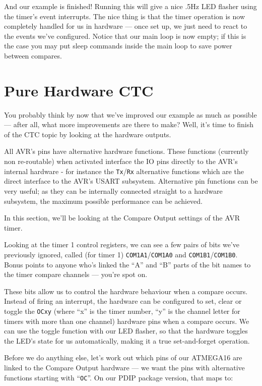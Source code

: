 \documentclass[a4paper,oneside,notitlepage]{book}
\begin{document}
And our example is finished! Running this will give a nice .5Hz LED flasher using the timer's event interrupts. The nice thing is that the timer operation is now completely handled for us in hardware --- once set up, we just need to react to the events we've configured. Notice that our main loop is now empty; if this is the case you may put sleep commands inside the main loop to save power between compares.


\label{chp:HWCTC}
\chapter{Pure Hardware CTC}

You probably think by now that we've improved our example as much as possible --- after all, what more improvements are there to make? Well, it's time to finish of the CTC topic by looking at the hardware outputs.

All AVR's pins have alternative hardware functions. These functions (currently non re-routable) when activated interface the IO pins directly to the AVR's internal hardware - for instance the \texttt{Tx}/\texttt{Rx} alternative functions which are the direct interface to the AVR's USART subsystem. Alternative pin functions can be very useful; as they can be internally connected straight to a hardware subsystem, the maximum possible performance can be achieved.

In this section, we'll be looking at the Compare Output settings of the AVR timer.

Looking at the timer 1 control registers, we can see a few pairs of bits we've previously ignored, called (for timer 1) \texttt{COM1A1}/\texttt{COM1A0} and \texttt{COM1B1}/\texttt{COM1B0}. Bonus points to anyone who's linked the ``A'' and ``B'' parts of the bit names to the timer compare channels --- you're spot on.

These bits allow us to control the hardware behaviour when a compare occurs. Instead of firing an interrupt, the hardware can be configured to set, clear or toggle the \texttt{OCxy} (where ``x'' is the timer number, ``y'' is the channel letter for timers with more than one channel) hardware pins when a compare occurs. We can use the toggle function with our LED flasher, so that the hardware toggles the LED's state for us automatically, making it a true set-and-forget operation.

Before we do anything else, let's work out which pins of our ATMEGA16 are linked to the Compare Output hardware --- we want the pins with alternative functions starting with ``\texttt{OC}''. On our PDIP package version, that maps to:
\end{document}
